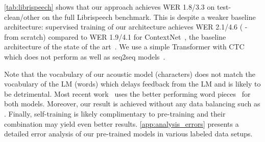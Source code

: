 \documentclass{article}
\begin{document}
\autoref{tab:librispeech} shows that our approach achieves WER 1.8/3.3 on test-clean/other on the full Librispeech benchmark.
This is despite a weaker baseline architecture: 
supervised training of our architecture achieves WER 2.1/4.6 (\wvppbig{} - from scratch) compared to WER 1.9/4.1 for ContextNet~\citep{han2020contextnet}, the baseline architecture of the state of the art~\citep{park2020improved}.
We use a simple Transformer with CTC which does not perform as well as seq2seq models~\citep{synnaeve2020end}. 

Note that the vocabulary of our acoustic model (characters) does not match the vocabulary of the LM (words) which delays feedback from the LM and is likely to be detrimental. 
Most recent work~\citep{synnaeve2020end,xu2020iterative,han2020contextnet,park2020improved} uses the better performing word pieces~\citep{schuster2012wordpieces} for both models.
Moreover, our result is achieved without any data balancing such as \cite{park2020improved}.
Finally, self-training is likely complimentary to pre-training and their combination may yield even better results.
\autoref{app:analysis_errors} presents a detailed error analysis of our pre-trained models in various labeled data setups.
\end{document}
